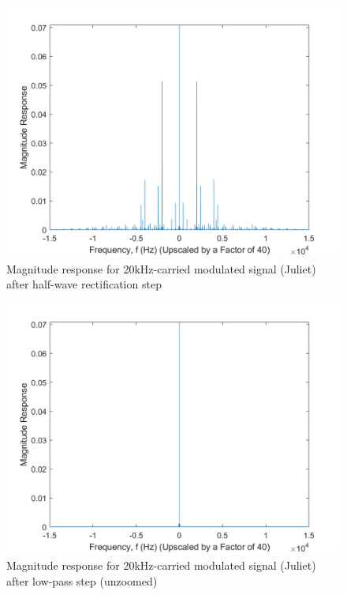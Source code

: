 \documentclass[journal]{IEEEtran}
\begin{document}
\begin{figure}[!htb]
	\centering
  \includegraphics[width=\columnwidth]{JulietHalfWaveMag.png}
    \caption{Magnitude response for 20kHz-carried modulated signal (Juliet) after half-wave rectification step}   
    \label{JulietHalfWave}
\end{figure}

\begin{figure}[!htb]
	\centering
  \includegraphics[width=\columnwidth]{JulietLowPassMagUnzoomed.png}
    \caption{Magnitude response for 20kHz-carried modulated signal (Juliet) after low-pass step (unzoomed)}   
    \label{JulietLowpassUnzoomed}
\end{figure}
\end{document}
